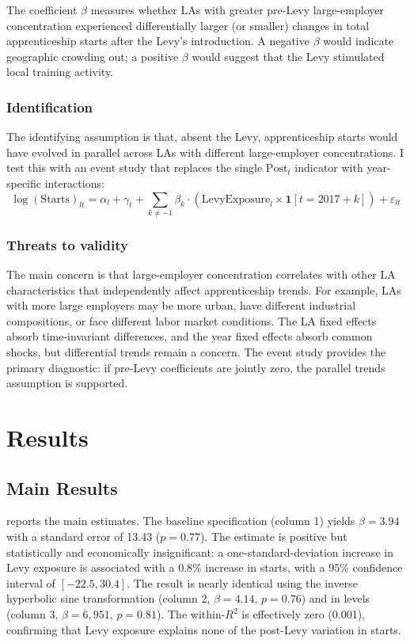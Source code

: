 \documentclass[12pt]{article}
\begin{document}
The coefficient $\beta$ measures whether LAs with greater pre-Levy large-employer concentration experienced differentially larger (or smaller) changes in total apprenticeship starts after the Levy's introduction. A negative $\beta$ would indicate geographic crowding out; a positive $\beta$ would suggest that the Levy stimulated local training activity.

\subsubsection*{Identification} The identifying assumption is that, absent the Levy, apprenticeship starts would have evolved in parallel across LAs with different large-employer concentrations. I test this with an event study that replaces the single $\text{Post}_t$ indicator with year-specific interactions:
\begin{equation}
\log(\text{Starts})_{lt} = \alpha_l + \gamma_t + \sum_{k \neq -1} \beta_k \cdot (\text{LevyExposure}_l \times \mathbf{1}[t = 2017 + k]) + \varepsilon_{lt}
\end{equation}

\subsubsection*{Threats to validity} The main concern is that large-employer concentration correlates with other LA characteristics that independently affect apprenticeship trends. For example, LAs with more large employers may be more urban, have different industrial compositions, or face different labor market conditions. The LA fixed effects absorb time-invariant differences, and the year fixed effects absorb common shocks, but differential trends remain a concern. The event study provides the primary diagnostic: if pre-Levy coefficients are jointly zero, the parallel trends assumption is supported.

\section{Results}

\subsection{Main Results}

 reports the main estimates. The baseline specification (column 1) yields $\beta = 3.94$ with a standard error of 13.43 ($p = 0.77$). The estimate is positive but statistically and economically insignificant: a one-standard-deviation increase in Levy exposure is associated with a 0.8\% increase in starts, with a 95\% confidence interval of $[-22.5, 30.4]$. The result is nearly identical using the inverse hyperbolic sine transformation (column 2, $\beta = 4.14$, $p = 0.76$) and in levels (column 3, $\beta = 6{,}951$, $p = 0.81$). The within-$R^2$ is effectively zero (0.001), confirming that Levy exposure explains none of the post-Levy variation in starts.
\end{document}
